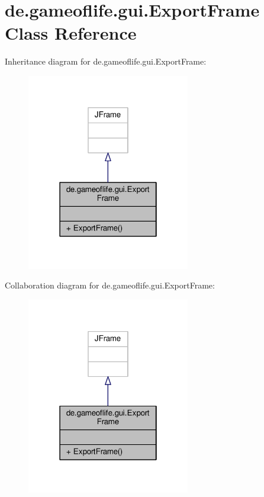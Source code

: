 \hypertarget{classde_1_1gameoflife_1_1gui_1_1ExportFrame}{\section{de.\-gameoflife.\-gui.\-Export\-Frame Class Reference}
\label{classde_1_1gameoflife_1_1gui_1_1ExportFrame}
}


Inheritance diagram for de.\-gameoflife.\-gui.\-Export\-Frame\-:\nopagebreak
\begin{figure}[H]
\begin{center}
\leavevmode
\includegraphics[width=202pt]{classde_1_1gameoflife_1_1gui_1_1ExportFrame__inherit__graph}
\end{center}
\end{figure}


Collaboration diagram for de.\-gameoflife.\-gui.\-Export\-Frame\-:\nopagebreak
\begin{figure}[H]
\begin{center}
\leavevmode
\includegraphics[width=202pt]{classde_1_1gameoflife_1_1gui_1_1ExportFrame__coll__graph}
\end{center}
\end{figure}
